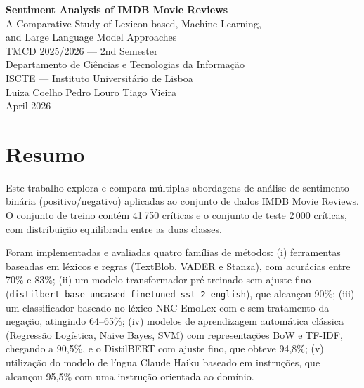 \documentclass[12pt,reqno,twoside]{amsbook}
\theoremstyle{plain}
\numberwithin{equation}{chapter}
\numberwithin{section}{chapter}
\begin{document}
\frontmatter
{}
\thispagestyle{empty}

\begin{center}
{\LARGE\bfseries Sentiment Analysis of IMDB Movie Reviews}\\[0.8em]
{\large A Comparative Study of Lexicon-based, Machine Learning,\\
and Large Language Model Approaches}\\[1.5em]
{\large TMCD 2025/2026 --- 2nd Semester}\\[0.5em]
{\large Departamento de Ci\^{e}ncias e Tecnologias da Informa\c{c}\~{a}o}\\[0.5em]
{\large ISCTE --- Instituto Universit\'{a}rio de Lisboa}\\[2em]
{\large Luiza Coelho \quad Pedro Louro \quad Tiago Vieira}\\[0.5em]
{\normalsize April 2026}
\end{center}

\setcounter{page}{1}

\chapter*{Resumo}

\noindent Este trabalho explora e compara m\'{u}ltiplas abordagens de an\'{a}lise de
sentimento bin\'{a}ria (positivo/negativo) aplicadas ao conjunto de dados IMDB Movie
Reviews. O conjunto de treino cont\'{e}m 41\,750 cr\'{i}ticas e o conjunto de teste
2\,000 cr\'{i}ticas, com distribui\c{c}\~{a}o equilibrada entre as duas classes.

Foram implementadas e avaliadas quatro fam\'{i}lias de m\'{e}todos:
(i) ferramentas baseadas em l\'{e}xicos e regras (TextBlob, VADER e Stanza),
com acu\-r\'{a}cias entre 70\% e 83\%;
(ii) um modelo transformador pr\'{e}-treinado sem ajuste fino
(\texttt{distilbert-base-uncased-finetuned-sst-2-english}), que alcan\c{c}ou 90\%;
(iii) um classificador baseado no l\'{e}xico NRC EmoLex com e sem tratamento da
nega\c{c}\~{a}o, atingindo 64--65\%;
(iv) modelos de aprendizagem autom\'{a}tica cl\'{a}ssica (Regress\~{a}o Log\'{i}stica,
Naive Bayes, SVM) com representa\c{c}\~{o}es BoW e TF-IDF, chegando a 90,5\%,
e o DistilBERT com ajuste fino, que obteve 94,8\%;
(v) utiliza\c{c}\~{a}o do modelo de l\'{i}ngua Claude Haiku baseado em instru\c{c}\~{o}es,
que alcan\c{c}ou 95,5\% com uma instru\c{c}\~{a}o orientada ao dom\'{i}nio.
\end{document}
